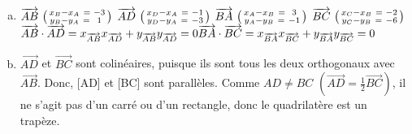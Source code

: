 \documentclass[12pt, a4paper]{article}
\begin{document}
\begin{Exercise}[number={72}]
    \begin{enumerate}[a)]
        \item $\overrightarrow{AB}\ \begin{psmallmatrix}x_B-x_A\ =& -3\\ y_B-y_A\ =& 1\end{psmallmatrix}$ \smallbreak $\overrightarrow{AD}\ \begin{psmallmatrix}x_D-x_A\ =& -1\\ y_D-y_A\ =& -3\end{psmallmatrix}$ \smallbreak $\overrightarrow{BA}\ \begin{psmallmatrix}x_A-x_B\ =& 3 \\ y_A-y_B\ =& -1 \end{psmallmatrix}$ \smallbreak $\overrightarrow{BC}\ \begin{psmallmatrix}x_C-x_B\ =& -2 \\ y_C-y_B\ =& -6\end{psmallmatrix}$ \medbreak $\overrightarrow{AB}\cdot\overrightarrow{AD}=x_{\overrightarrow{AB}}x_{\overrightarrow{AD}}+y_{\overrightarrow{AB}}y_{\overrightarrow{AD}}=0 \\ \overrightarrow{BA}\cdot\overrightarrow{BC}=x_{\overrightarrow{BA}}x_{\overrightarrow{BC}}+y_{\overrightarrow{BA}}y_{\overrightarrow{BC}}=0$
        \item $\overrightarrow{AD}$ et $\overrightarrow{BC}$ sont colinéaires, puisque ils sont tous les deux orthogonaux avec $\overrightarrow{AB}$. Donc, [AD] et [BC] sont parallèles. Comme $AD\neq BC$ $(\overrightarrow{AD}=\frac{1}{2}\overrightarrow{BC})$, il ne s'agit pas d'un carré ou d'un rectangle, donc le quadrilatère est un trapèze.
    \end{enumerate}
\end{Exercise}
\end{document}
